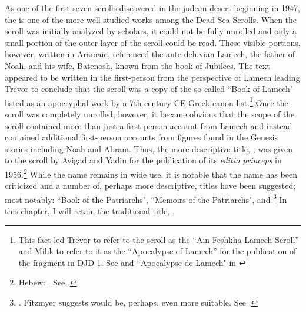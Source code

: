 
As one of the first seven scrolls discovered in the judean desert beginning in 1947, the \ga is one of the more well-studied works among the Dead Sea Scrolls. When the scroll was initially analyzed by scholars, it could not be fully unrolled and only a small portion of the outer layer of the scroll could be read. These visible portions, however, written in Aramaic, referenced the ante-deluvian Lamech, the father of Noah, and his wife, Batenosh, known from the book of Jubilees. The text appeared to be written in the first-person from the perspective of Lamech leading Trevor to conclude that the scroll was a copy of the so-called ``Book of Lamech" listed as an apocryphal work by a 7th century CE Greek canon list.\footnote{This fact led Trevor to refer to the scroll as the ``Ain Feshkha Lamech Scroll'' and Milik to refer to it as the ``Apocalypse of Lamech'' for the publication of the fragment in DJD 1. See \cite[9--10]{trevor_basor1949} and ``Apocalypse de Lamech" in \cite[86--87]{djd_1}} Once the scroll was completely unrolled, however, it became obvious that the scope of the scroll contained more than just a first-person account from Lamech and instead contained additional first-person accounts from figures found in the Genesis stories including Noah and Abram. Thus, the more descriptive title, , was given to the scroll by Avigad and Yadin for the publication of its \emph{editio princeps} in 1956.\footnote{Hebew: . See \cite{avigad-yadin1956}.} While the name \ga remains in wide use, it is notable that the name has been criticized and a number of, perhaps more descriptive, titles have been suggested; most notably: ``Book of the Patriarchs"\autocite[Hebrew: . As suggested by Mazar in][379 n. 2]{flusser_ks1956}, ``Memoirs of the Patriarchs"\autocite[358]{gaster1976}, and \footnote{\cite[14 n. 1.]{milik1959}.  Fitzmyer suggests  would be, perhaps, even more suitable. See \cite[16]{fitzmyer2004}.} In this chapter, I will retain the traditional title, \ga.

